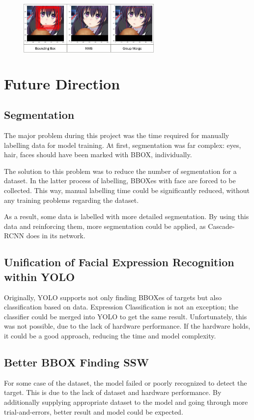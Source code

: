\documentclass{article}
\begin{document}
\begin{figure}[h]
  \centering
  \includegraphics[width=7cm]{image/GMSvsNMS.png}
\end{figure}

\section{Future Direction}
\subsection{Segmentation}
The major problem during this project was the time required for manually
labelling data for model training. At first, segmentation was far complex: eyes,
hair, faces should have been marked with BBOX, individually.

The solution to this problem was to reduce the number of segmentation for a
dataset. In the latter process of labelling, BBOXes with face are forced to be
collected. This way, manual labelling time could be significantly reduced,
without any training problems regarding the dataset.

As a result, some data is labelled with more detailed segmentation. By using
this data and reinforcing them, more segmentation could be applied, as
Cascade-RCNN does in its network.

\subsection{Unification of Facial Expression Recognition within YOLO}
Originally, YOLO supports not only finding BBOXes of targets but also
classification based on data. Expression Classification is not an exception; the
classifier could be merged into YOLO to get the same result. Unfortunately, this
was not possible, due to the lack of hardware performance. If the hardware
holds, it could be a good approach, reducing the time and model complexity.

\subsection{Better BBOX Finding SSW}
For some case of the dataset, the model failed or poorly recognized to detect
the target. This is due to the lack of dataset and hardware performance. By
additionally supplying appropriate dataset to the model and going through more
trial-and-errors, better result and model could be expected.



\end{document}
